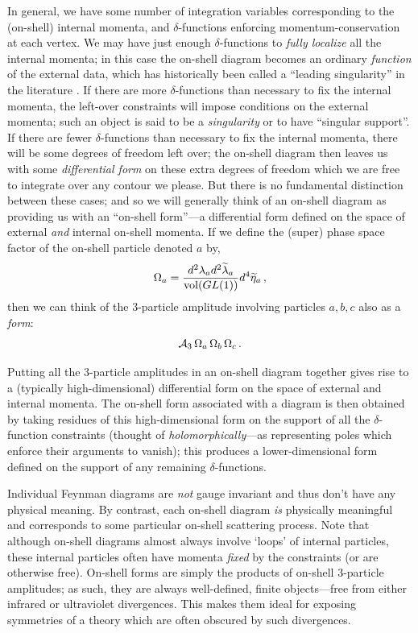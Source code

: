 \documentclass[12pt,hyperref,compress]{JHEP3}
\newcommand{\eq}[1]{\begin{equation}#1\end{equation}}
\begin{document}
In general, we have some number of integration variables corresponding to the (on-shell) internal momenta, and $\delta$-functions enforcing momentum-conservation at each vertex. We may have just enough $\delta$-functions to {\it fully localize} all the internal momenta; in this case the on-shell diagram becomes an ordinary {\it function} of the external data, which has historically been called a ``leading singularity'' in the literature \cite{ELOP,GreyBook}. If there are more $\delta$-functions than necessary to fix the internal momenta, the left-over constraints will impose conditions on the external momenta; such an object is said to be a {\it singularity} or to have ``singular support''. If there are fewer $\delta$-functions than necessary to fix the internal momenta, there will be some degrees of freedom left over; the on-shell diagram then leaves us with some {\it differential form} on these extra degrees of freedom which we are free to integrate over any contour we please. But there is no fundamental distinction between these cases; and so we will generally think of an on-shell diagram as providing us with an ``on-shell form''---a differential form defined on the space of external {\it and} internal on-shell momenta. If we define the (super) phase space factor of the on-shell particle denoted $a$ by,
\vspace{-.2cm}\eq{\Omega_a= \frac{d^2 \lambda_a d^2 \widetilde \lambda_a}{\mathrm{vol}(GL(1))} d^4 \widetilde \eta_a\,,\vspace{-.2cm}}
then we can think of the $3$-particle amplitude involving particles $a,b,c$ also as a {\it form}:\\[-10pt]
\vspace{-.2cm}\eq{\mathcal{A}_3\,\Omega_a\,\Omega_b\,\Omega_c\,.\vspace{-.2cm}}

Putting all the $3$-particle amplitudes in an on-shell diagram together gives rise to a (typically high-dimensional) differential form on the space of external and internal momenta. The on-shell form associated with a diagram is then obtained by taking residues of this high-dimensional form on the support of all the $\delta$-function constraints (thought of {\it holomorphically}---as representing poles which enforce their arguments to vanish); this produces a lower-dimensional form defined on the support of any remaining $\delta$-functions.

Individual Feynman diagrams are {\it not} gauge invariant  and thus don't have any physical meaning. By contrast, each on-shell diagram {\it is} physically meaningful and corresponds to some particular on-shell scattering process. Note that although on-shell diagrams almost always involve `loops' of internal particles, these internal particles often have momenta {\it fixed} by the constraints (or are otherwise free). On-shell forms are simply the products of on-shell $3$-particle amplitudes; as such, they are always well-defined, finite objects---free from either infrared or ultraviolet divergences. This makes them ideal for exposing symmetries of a theory which are often obscured by such divergences.
\end{document}
